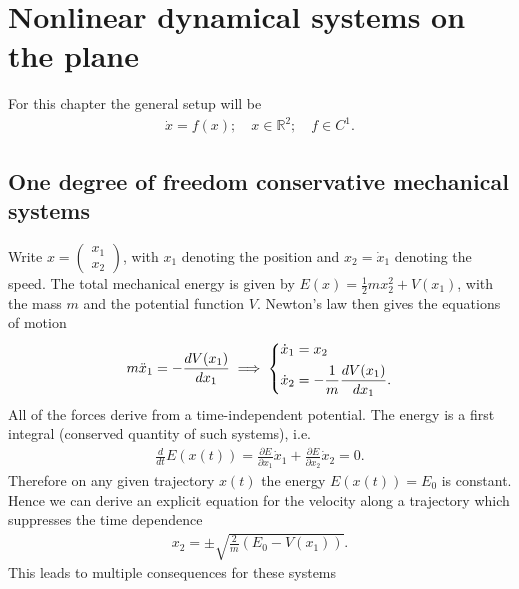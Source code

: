 \chapter{Nonlinear dynamical systems on the plane}
For this chapter the general setup will be 
\begin{align}
	\dot{x} = f(x);\quad x \in \mathbb{R}^{2};\quad f\in C^1.
\end{align}
\section{One degree of freedom conservative mechanical systems}
Write $x = 
\begin{pmatrix}
	x_1 \\ x_2
\end{pmatrix}
$, with $x_1$ denoting the position and $x_2=\dot{x}_1$ denoting the speed. The total mechanical energy is given by $E(x) = \frac{1}{2}mx_2^2  + V(x_1)$, with the mass $m$ and the potential function $V$. Newton's law then gives the equations of motion 
\begin{align}
	m \ddot{x}_1 = -\frac{dV(x_1)}{dx_1} \implies 
	\begin{dcases}
		\dot{x}_1 = x_2 \\
		\dot{x}_2 = - \frac{1}{m} \frac{dV(x_1)}{dx_1}.
	\end{dcases}
\end{align}
All of the forces derive from a time-independent potential. The energy is a first integral (conserved quantity of such systems), i.e.
\begin{align}
	\frac{d}{dt}E(x(t)) = \frac{\partial E}{\partial x_1}\dot{x}_1 + \frac{\partial E}{\partial x_2}\dot{x}_2 = 0.
\end{align}
Therefore on any given trajectory $x(t)$ the energy $E(x(t))=E_0 $ is constant. Hence we can derive an explicit equation for the velocity along a trajectory which suppresses the time dependence
\begin{align}
	x_2 = \pm \sqrt{\frac{2}{m}(E_0 -V(x_1))}.
\end{align}
This leads to multiple consequences for these systems
